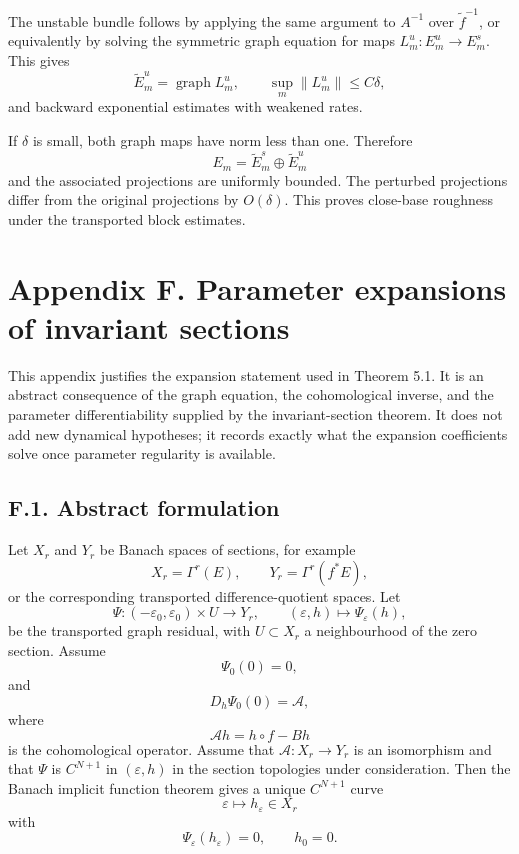 \documentclass[12pt,a4paper]{article}
\theoremstyle{plain}
\numberwithin{equation}{section}
\numberwithin{theorem}{section}
\begin{document}
The unstable bundle follows by applying the same argument to $A^{-1}$ over $\widetilde f^{-1}$, or equivalently by solving the symmetric graph equation for maps $L_m^u:E_m^u\to E_m^s$. This gives
\[
\widetilde E_m^u=
\operatorname{graph}L_m^u,
\qquad
\sup_m\|L_m^u\|\le C\delta,
\]
and backward exponential estimates with weakened rates.

If $\delta$ is small, both graph maps have norm less than one. Therefore
\[
E_m=
\widetilde E_m^s\oplus\widetilde E_m^u
\]
and the associated projections are uniformly bounded. The perturbed projections differ from the original projections by $O(\delta)$. This proves close-base roughness under the transported block estimates.

\clearpage

\section{Appendix F. Parameter expansions of invariant sections}

This appendix justifies the expansion statement used in Theorem 5.1. It is an abstract consequence of the graph equation, the cohomological inverse, and the parameter differentiability supplied by the invariant-section theorem. It does not add new dynamical hypotheses; it records exactly what the expansion coefficients solve once parameter regularity is available.

\subsection{F.1. Abstract formulation}

Let $X_r$ and $Y_r$ be Banach spaces of sections, for example
\[
X_r=\Gamma^r(E),
\qquad
Y_r=\Gamma^r(f^*E),
\]
or the corresponding transported difference-quotient spaces. Let
\[
\Psi:(-\varepsilon_0,
\varepsilon_0)\times U\to Y_r,
\qquad
(\varepsilon,h)
\mapsto
\Psi_\varepsilon(h),
\]
be the transported graph residual, with $U\subset X_r$ a neighbourhood of the zero section. Assume
\[
\Psi_0(0)=0,
\]
and
\[
D_h\Psi_0(0)=\mathcal A,
\]
where
\[
\mathcal A h=h\circ f-Bh
\]
is the cohomological operator. Assume that $\mathcal A:X_r\to Y_r$ is an isomorphism and that $\Psi$ is $C^{N+1}$ in $(\varepsilon,h)$ in the section topologies under consideration. Then the Banach implicit function theorem gives a unique $C^{N+1}$ curve
\[
\varepsilon\mapsto h_\varepsilon\in X_r
\]
with
\[
\Psi_\varepsilon(h_\varepsilon)=0,
\qquad
h_0=0.
\]
\end{document}
